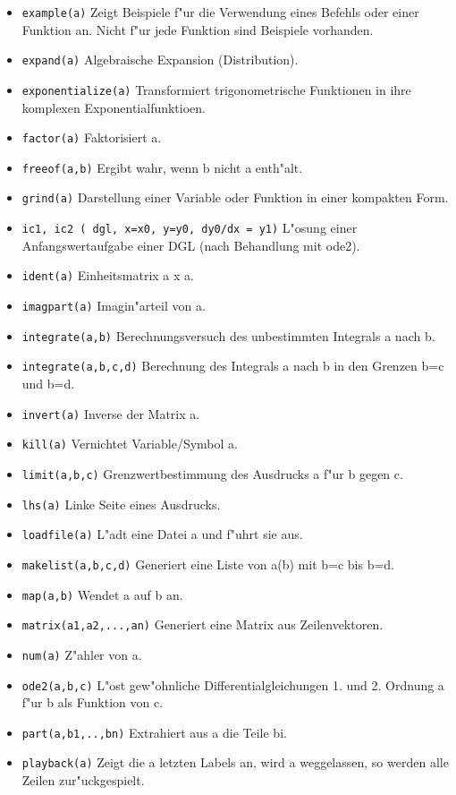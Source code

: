 \documentclass[spanish,12pt,a4paper]{article}
\begin{document}
\begin{itemize}
\item \verb|example(a)| Zeigt Beispiele f"ur die Verwendung eines Befehls oder einer Funktion an. Nicht f"ur jede Funktion sind Beispiele vorhanden.
\item \verb|expand(a)| Algebraische Expansion (Distribution).
\item \verb|exponentialize(a)| Transformiert trigonometrische Funktionen in ihre komplexen Exponentialfunktioen.
\item \verb|factor(a)| Faktorisiert a.
\item \verb|freeof(a,b)| Ergibt wahr, wenn b nicht a enth"alt.
\item \verb|grind(a)| Darstellung einer Variable oder Funktion in einer kompakten Form.
\item \verb|ic1, ic2 ( dgl, x=x0, y=y0, dy0/dx = y1)| L"osung einer Anfangswertaufgabe einer DGL (nach Behandlung mit ode2).
\item \verb|ident(a)| Einheitsmatrix a x a.
\item \verb|imagpart(a)| Imagin"arteil von a.
\item \verb|integrate(a,b)| Berechnungsversuch des unbestimmten Integrals a nach b.
\item \verb|integrate(a,b,c,d)| Berechnung des Integrals a nach b in den Grenzen b=c und b=d.
\item \verb|invert(a)| Inverse der Matrix a.
\item \verb|kill(a)| Vernichtet Variable/Symbol a.
\item \verb|limit(a,b,c)| Grenzwertbestimmung des Ausdrucks a f"ur b gegen c.
\item \verb|lhs(a)| Linke Seite eines Ausdrucks.
\item \verb|loadfile(a)| L"adt eine Datei a und f"uhrt sie aus.
\item \verb|makelist(a,b,c,d)| Generiert eine Liste von a(b) mit b=c bis b=d.
\item \verb|map(a,b)| Wendet a auf b an.
\item \verb|matrix(a1,a2,...,an)| Generiert eine Matrix aus Zeilenvektoren.
\item \verb|num(a)| Z"ahler von a.
\item \verb|ode2(a,b,c)| L"ost gew"ohnliche Differentialgleichungen 1. und 2. Ordnung a f"ur b als Funktion von c.
\item \verb|part(a,b1,..,bn)| Extrahiert aus a die Teile bi.
\item \verb|playback(a)| Zeigt die a letzten Labels an, wird a weggelassen, so werden alle Zeilen zur"uckgespielt.

\end{itemize}
\end{document}
